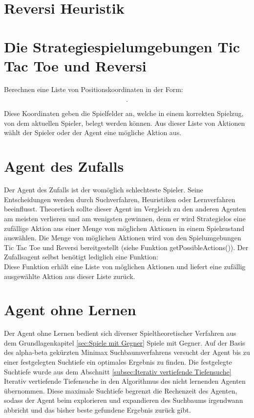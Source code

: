 \section{Reversi Heuristik}
\label{sec:Reversi Heuristik}

\section{Die Strategiespielumgebungen Tic Tac Toe und Reversi}

Berechnen eine Liste von Positionskoordinaten in der Form: 

\begin{equation*}
[Tupel(X_a Koordinate, Y_b Koordinate), ...].
\end{equation*}

Diese Koordinaten geben die Spielfelder an, welche in einem korrekten Spielzug, von dem aktuellen Spieler, belegt werden können. Aus dieser Liste von Aktionen wählt der Spieler oder der Agent eine mögliche Aktion aus.\\

\section{Agent des Zufalls}
Der Agent des Zufalls ist der womöglich schlechteste Spieler. Seine Entscheidungen werden durch Suchverfahren, Heuristiken oder Lernverfahren beeinflusst. Theoretisch sollte dieser Agent im Vergleich zu den anderen Agenten am meisten verlieren und am wenigsten gewinnen, denn er wird Strategielos eine zufällige Aktion aus einer Menge von möglichen Aktionen in einem Spielzustand auswählen. Die Menge von möglichen Aktionen wird von den Spielumgebungen Tic Tac Toe und Reversi bereitgestellt (siehe Funktion getPossibleActions()). Der Zufallsagent selbst benötigt lediglich eine Funktion:\\

Diese Funktion erhält eine Liste von möglichen Aktionen und liefert eine zufällig ausgewählte Aktion aus dieser Liste zurück.

\section{Agent ohne Lernen}
Der Agent ohne Lernen bedient sich diverser Spieltheoretischer Verfahren aus dem Grundlagenkapitel \ref{sec:Spiele mit Gegner} Spiele mit Gegner. Auf der Basis des alpha-beta gekürzten Minimax Suchbaumverfahrens versucht der Agent bis zu einer festgelegten Suchtiefe ein optimales Ergebnis zu finden. Die festgelegte Suchtiefe wurde aus dem Abschnitt \ref{subsec:Iterativ vertiefende Tiefensuche} Iterativ vertiefende Tiefensuche in den Algorithmus des nicht lernenden Agenten übernommen. Diese maximale Suchtiefe begrenzt die Rechenzeit des Agenten, sodass der Agent beim explorieren und expandieren des Suchbaums irgendwann abbricht und das bisher beste gefundene Ergebnis zurück gibt. \\

